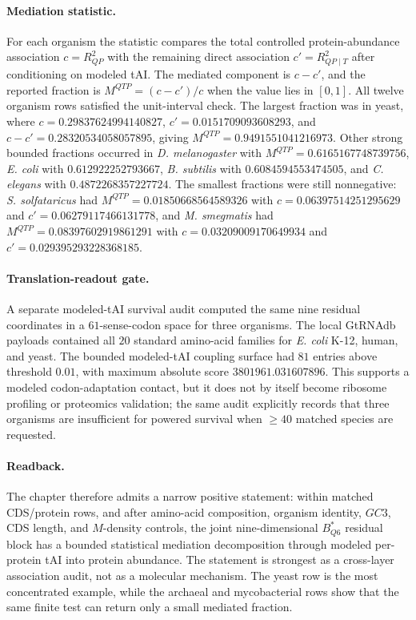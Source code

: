 \paragraph{Mediation statistic.}
For each organism the statistic compares the total controlled protein-abundance association $c=R^2_{QP}$ with the remaining direct association $c'=R^2_{QP\mid T}$ after conditioning on modeled tAI. The mediated component is $c-c'$, and the reported fraction is $M^{QTP}=(c-c')/c$ when the value lies in $[0,1]$. All twelve organism rows satisfied the unit-interval check. The largest fraction was in yeast, where $c=0.29837624994140827$, $c'=0.0151709093608293$, and $c-c'=0.28320534058057895$, giving $M^{QTP}=0.9491551041216973$. Other strong bounded fractions occurred in \emph{D. melanogaster} with $M^{QTP}=0.6165167748739756$, \emph{E. coli} with $0.612922252793667$, \emph{B. subtilis} with $0.6084594553474505$, and \emph{C. elegans} with $0.4872268357227724$. The smallest fractions were still nonnegative: \emph{S. solfataricus} had $M^{QTP}=0.01850668564589326$ with $c=0.06397514251295629$ and $c'=0.06279117466131778$, and \emph{M. smegmatis} had $M^{QTP}=0.08397602919861291$ with $c=0.03209009170649934$ and $c'=0.029395293228368185$.

\paragraph{Translation-readout gate.}
A separate modeled-tAI survival audit computed the same nine residual coordinates in a $61$-sense-codon space for three organisms. The local GtRNAdb payloads contained all $20$ standard amino-acid families for \emph{E. coli} K-12, human, and yeast. The bounded modeled-tAI coupling surface had $81$ entries above threshold $0.01$, with maximum absolute score $3801961.031607896$. This supports a modeled codon-adaptation contact, but it does not by itself become ribosome profiling or proteomics validation; the same audit explicitly records that three organisms are insufficient for powered survival when $\geq 40$ matched species are requested.

\paragraph{Readback.}
The chapter therefore admits a narrow positive statement: within matched CDS/protein rows, and after amino-acid composition, organism identity, $GC3$, CDS length, and $M$-density controls, the joint nine-dimensional $B^{*}_{Q6}$ residual block has a bounded statistical mediation decomposition through modeled per-protein tAI into protein abundance. The statement is strongest as a cross-layer association audit, not as a molecular mechanism. The yeast row is the most concentrated example, while the archaeal and mycobacterial rows show that the same finite test can return only a small mediated fraction.


